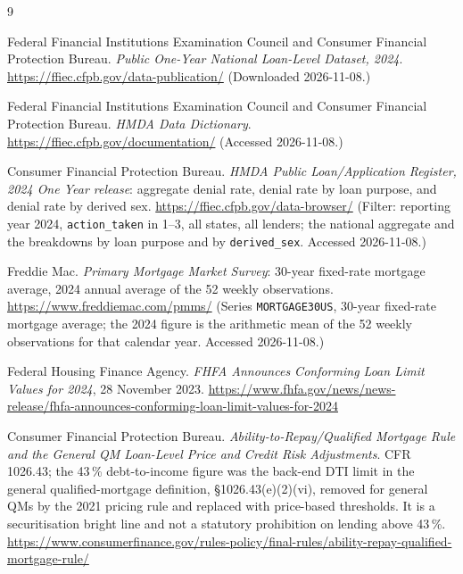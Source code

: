 \documentclass[sigconf,balance=false]{acmart}
\begin{document}
\clearpage
\begin{thebibliography}{9}

Federal Financial Institutions Examination Council and Consumer Financial
  Protection Bureau.
\newblock \emph{Public One-Year National Loan-Level Dataset, 2024}.
\newblock \url{https://ffiec.cfpb.gov/data-publication/}
\newblock (Downloaded 2026-11-08.)

Federal Financial Institutions Examination Council and Consumer Financial
  Protection Bureau.
\newblock \emph{HMDA Data Dictionary}.
\newblock \url{https://ffiec.cfpb.gov/documentation/}
\newblock (Accessed 2026-11-08.)

Consumer Financial Protection Bureau.
\newblock \emph{HMDA Public Loan/Application Register, 2024 One Year
  release}: aggregate denial rate, denial rate by loan purpose, and denial
  rate by derived sex.
\newblock \url{https://ffiec.cfpb.gov/data-browser/}
\newblock (Filter: reporting year 2024, \texttt{action\_\allowbreak taken}
  in 1--3, all states, all lenders; the national aggregate and the
  breakdowns by loan purpose and by \texttt{derived\_\allowbreak sex}.
  Accessed 2026-11-08.)

Freddie Mac.
\newblock \emph{Primary Mortgage Market Survey}: 30-year fixed-rate mortgage
  average, 2024 annual average of the 52 weekly observations.
\newblock \url{https://www.freddiemac.com/pmms/}
\newblock (Series \texttt{MORTGAGE30US}, 30-year fixed-rate mortgage
  average; the 2024 figure is the arithmetic mean of the 52 weekly
  observations for that calendar year. Accessed 2026-11-08.)

Federal Housing Finance Agency.
\newblock \emph{FHFA Announces Conforming Loan Limit Values for 2024},
  28 November 2023.
\newblock
\url{https://www.fhfa.gov/news/news-release/fhfa-announces-conforming-loan-limit-values-for-2024}

Consumer Financial Protection Bureau.
\newblock \emph{Ability-to-Repay/Qualified Mortgage Rule and the General
  QM Loan-Level Price and Credit Risk Adjustments}.
 CFR 1026.43; the 43\,\% debt-to-income figure was the back-end
  DTI limit in the general qualified-mortgage definition,
  \S1026.43(e)(2)(vi), removed for general QMs by the 2021 pricing rule and
  replaced with price-based thresholds. It is a securitisation bright line
  and not a statutory prohibition on lending above 43\,\%.
\newblock
\url{https://www.consumerfinance.gov/rules-policy/final-rules/ability-repay-qualified-mortgage-rule/}


\end{thebibliography}
\end{document}
